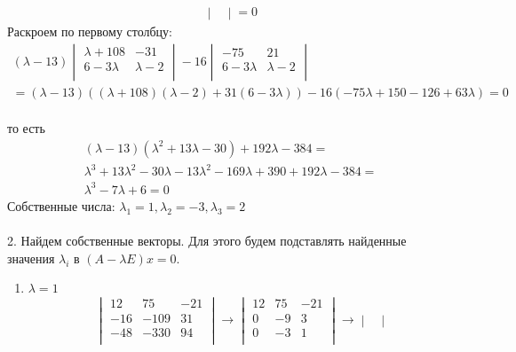 \begin{enumerate}
\begin{gather*}
\begin{vmatrix}
				\end{vmatrix}
				= 0 
			\end{gather*}
			Раскроем по первому столбцу:
			\begin{gather*}
				(\lambda - 13)
				\begin{vmatrix}
					\lambda + 108 & -31\\
					6 - 3\lambda & \lambda - 2\\
				\end{vmatrix}
				- 16 
				\begin{vmatrix}
					-75 & 21\\
					6 - 3\lambda & \lambda - 2\\
				\end{vmatrix}
				\\
				= (\lambda - 13)((\lambda + 108)(\lambda - 2) + 31(6 - 3 \lambda)) - 16(-75 \lambda + 150 - 126 + 63\lambda) = 0
			\end{gather*}
			\\
			то есть 
			\begin{gather*}
				(\lambda - 13)(\lambda^{2} + 13\lambda - 30) + 192\lambda - 384 =\\
				\lambda^{3} + 13 \lambda^{2} - 30\lambda - 13\lambda^{2} - 169\lambda + 390 + 192\lambda - 384 =\\
				\lambda^{3} - 7\lambda + 6 = 0
			\end{gather*}
			Собственные числа: $\lambda_{1} = 1, \lambda_{2} = -3, \lambda_{3} = 2$\\
			\\
			2. Найдем собственные векторы. Для этого будем подставлять найденные значения $\lambda_{i}$ в $(A - \lambda E)x = 0$. 
			\begin{enumerate}
			\item $\lambda = 1$\\
				\begin{gather*}
					\begin{vmatrix}
						12 & 75 & -21\\
						-16 & -109 & 31\\
						-48 & -330 & 94\\
					\end{vmatrix}
					\to
					\begin{vmatrix}
						12 & 75 & -21\\ 
						0 & -9 & 3\\
						0 & -3 & 1\\
					\end{vmatrix}
					\to
					\begin{vmatrix}

\end{vmatrix}
\end{gather*}
\end{enumerate}
\end{enumerate}

